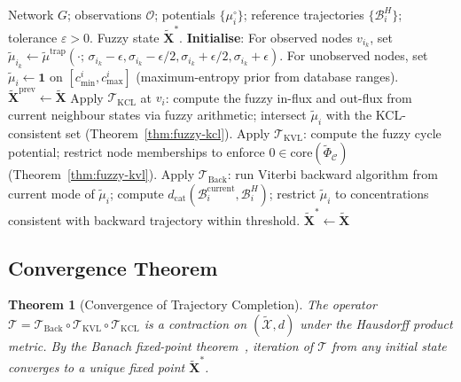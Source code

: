 \documentclass[twocolumn,10pt,a4paper]{article}
\newcommand{\dcat}{d_{\mathrm{cat}}}
\newcommand{\Back}{\mathcal{B}}
\newtheorem{theorem}{Theorem}[section]
\begin{document}
\begin{algorithm}[t]
\caption{Trajectory Completion Algorithm}
\label{alg:tc}
\begin{algorithmic}[1]
\Require Network $G$; observations $\mathcal{O}$; potentials $\{\mu_i^\circ\}$;
         reference trajectories $\{\Back_i^H\}$; tolerance $\varepsilon>0$.
\Ensure  Fuzzy state $\widetilde{\mathbf{X}}^*$.
\State \textbf{Initialise}: For observed nodes $v_{i_k}$, set
       $\tilde{\mu}_{i_k}\leftarrow\tilde{\mu}^{\mathrm{trap}}(\cdot;\,
       \sigma_{i_k}-\epsilon,\sigma_{i_k}-\epsilon/2,\sigma_{i_k}+\epsilon/2,
       \sigma_{i_k}+\epsilon)$.
       For unobserved nodes, set
       $\tilde{\mu}_i\leftarrow\mathbf{1}$ on $[c_{\min}^i,c_{\max}^i]$
       (maximum-entropy prior from database ranges).
\Repeat
  \State $\widetilde{\mathbf{X}}^{\mathrm{prev}}\leftarrow\widetilde{\mathbf{X}}$
    \State Apply $\mathcal{T}_{\mathrm{KCL}}$ at $v_i$: compute the fuzzy
           in-flux and out-flux from current neighbour states via fuzzy
           arithmetic; intersect $\tilde{\mu}_i$ with the KCL-consistent set
           (Theorem~\ref{thm:fuzzy-kcl}).
  \EndFor
    \State Apply $\mathcal{T}_{\mathrm{KVL}}$: compute the fuzzy cycle
           potential; restrict node memberships to enforce
           $0\in\mathrm{core}(\widetilde{\Phi}_{\mathcal{C}})$
           (Theorem~\ref{thm:fuzzy-kvl}).
  \EndFor
    \State Apply $\mathcal{T}_{\mathrm{Back}}$: run Viterbi backward algorithm
           from current mode of $\tilde{\mu}_i$; compute
           $\dcat(\Back_i^{\mathrm{current}},\Back_i^H)$; restrict
           $\tilde{\mu}_i$ to concentrations consistent with backward
           trajectory within threshold.
  \EndFor
{}
\State \Return $\widetilde{\mathbf{X}}^*\leftarrow\widetilde{\mathbf{X}}$
\end{algorithmic}
\end{algorithm}

\subsection{Convergence Theorem}
\label{sec:alg-convergence}

\begin{theorem}[Convergence of Trajectory Completion]
\label{thm:convergence}
The operator $\mathcal{T}=\mathcal{T}_{\mathrm{Back}}\circ
\mathcal{T}_{\mathrm{KVL}}\circ\mathcal{T}_{\mathrm{KCL}}$ is a contraction
on $(\widetilde{\mathcal{X}},d)$ under the Hausdorff product metric.  By the
Banach fixed-point theorem~\cite{Banach1922}, iteration of $\mathcal{T}$
from any initial state converges to a unique fixed point
$\widetilde{\mathbf{X}}^*$.
\end{theorem}
\end{document}
